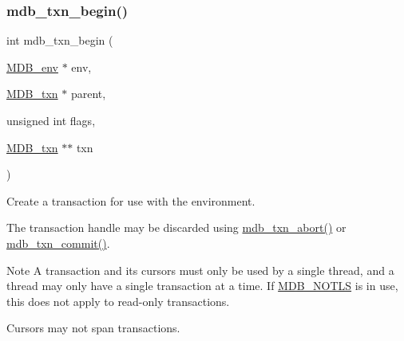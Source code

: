\subsubsection{\texorpdfstring{mdb\+\_\+txn\+\_\+begin()}{mdb\_txn\_begin()}}
{\footnotesize\ttfamily int mdb\+\_\+txn\+\_\+begin (\begin{DoxyParamCaption}\item[{\mbox{\hyperlink{struct_m_d_b__env}{M\+D\+B\+\_\+env}} $\ast$}]{env,  }\item[{\mbox{\hyperlink{struct_m_d_b__txn}{M\+D\+B\+\_\+txn}} $\ast$}]{parent,  }\item[{unsigned int}]{flags,  }\item[{\mbox{\hyperlink{struct_m_d_b__txn}{M\+D\+B\+\_\+txn}} $\ast$$\ast$}]{txn }\end{DoxyParamCaption})}



Create a transaction for use with the environment. 

The transaction handle may be discarded using \mbox{\hyperlink{group__mdb_ga73a5938ae4c3239ee11efa07eb22b882}{mdb\+\_\+txn\+\_\+abort()}} or \mbox{\hyperlink{group__mdb_ga846fbd6f46105617ac9f4d76476f6597}{mdb\+\_\+txn\+\_\+commit()}}. \begin{DoxyNote}{Note}
A transaction and its cursors must only be used by a single thread, and a thread may only have a single transaction at a time. If \mbox{\hyperlink{group__mdb__env_ga5dca84a576d14b4bfe2deddc2dc622d3}{M\+D\+B\+\_\+\+N\+O\+T\+LS}} is in use, this does not apply to read-\/only transactions. 

Cursors may not span transactions. 
\end{DoxyNote}

